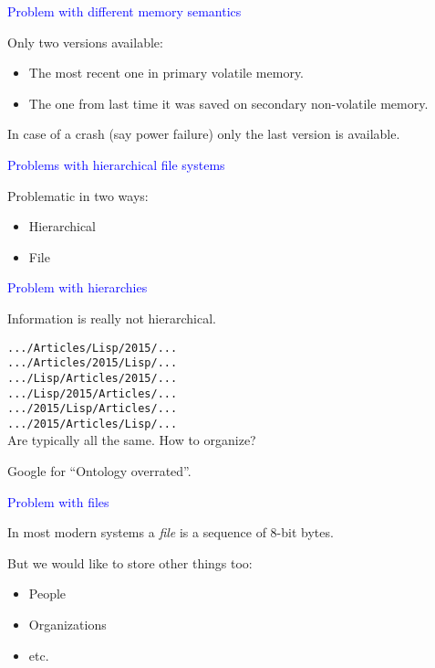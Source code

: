 \documentclass{slides}
\newcommand{\ti}[1]{\begin{center}\Large{\textcolor{blue}{#1}}\end{center}}
\begin{document}
\begin{slide}\ti{Problem with different memory semantics}

Only two versions available:

\begin{itemize}
\item The most recent one in primary volatile memory.
\item The one from last time it was saved on secondary non-volatile
  memory.
\end{itemize}

In case of a crash (say power failure) only the last version is
available.

\vfill\end{slide}
\begin{slide}\ti{Problems with hierarchical file systems}
\vskip 0.5cm
Problematic in two ways:

\begin{itemize}
\item Hierarchical
\item File
\end{itemize}

\vfill\end{slide}
\begin{slide}\ti{Problem with hierarchies}
\vskip 0.5cm
Information is really not hierarchical. 

\texttt{.../Articles/Lisp/2015/...}\\
\texttt{.../Articles/2015/Lisp/...}\\
\texttt{.../Lisp/Articles/2015/...}\\
\texttt{.../Lisp/2015/Articles/...}\\
\texttt{.../2015/Lisp/Articles/...}\\
\texttt{.../2015/Articles/Lisp/...}\\

Are typically all the same.  How to organize?

Google for ``Ontology overrated''.

\vfill\end{slide}
\begin{slide}\ti{Problem with files}
\vskip 0.5cm
In most modern systems a \emph{file} is a sequence of 8-bit bytes.

But we would like to store other things too:

\begin{itemize}
\item People
\item Organizations
\item etc.
\end{itemize}

\vfill\end{slide}
\end{document}
